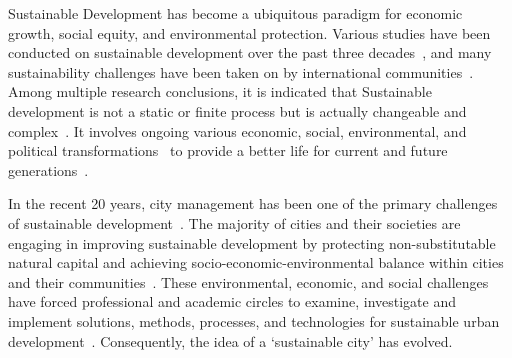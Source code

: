 \documentclass[5p,times]{elsarticle}
\begin{document}






Sustainable Development has become a ubiquitous paradigm for economic growth, social equity, and environmental protection. Various studies have been conducted on sustainable development over the past three decades~\cite{olawumi2018scientometric, zemigala2019tendencies}, and many sustainability challenges have been taken on by international communities~\cite{un2015, un2016a}. Among multiple research conclusions, it is indicated that Sustainable development is not a static or finite process but is actually changeable and complex~\cite{frini2018making, frini2020temporal, banamar2018extension}. It involves ongoing various economic, social, environmental, and political transformations~\cite{hassan2015paradox} to provide a better life for current and future generations~\cite{wced1987world}.

In the recent 20 years, city management has been one of the primary challenges of sustainable development~\cite{bibri2017ict, bouzguenda2019towards}. The majority of cities and their societies are engaging in improving sustainable development by protecting non-substitutable natural capital and achieving socio-economic-environmental balance within cities and their communities~\cite{heikkinen2019urban}. These environmental, economic, and social challenges have forced professional and academic circles to examine, investigate and implement solutions, methods, processes, and technologies for sustainable urban development~\cite{bouzguenda2019towards}. Consequently, the idea of a ‘sustainable city’ has evolved.
\end{document}
